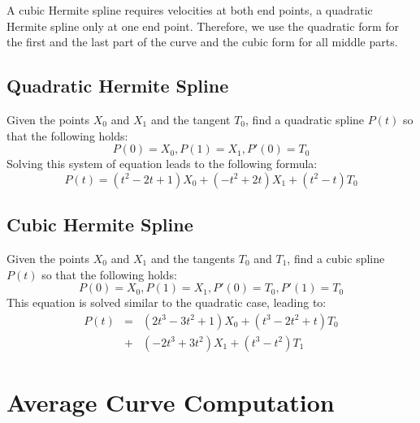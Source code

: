 \documentclass[journal, letterpaper]{IEEEtran}
\begin{document}
A cubic Hermite spline requires velocities at both end points, a quadratic Hermite spline only at one end point. Therefore, we use the quadratic form for the first and the last part of the curve and the cubic form for all middle parts.

\subsection{Quadratic Hermite Spline}
Given the points $X_0$ and $X_1$ and the tangent $T_0$, find a quadratic spline $P(t)$ so that the following holds:
\begin{equation}
 P(0)=X_0, P(1)=X_1, P'(0)=T_0
\end{equation}
Solving this system of equation leads to the following formula:
\begin{equation}
 P(t) = (t^2-2t+1)X_0 + (-t^2+2t)X_1 + (t^2-t)T_0
\label{eq:QuadraticHermite}
\end{equation}

\subsection{Cubic Hermite Spline}
Given the points $X_0$ and $X_1$ and the tangents $T_0$ and $T_1$, find a cubic spline $P(t)$ so that the following holds:
\begin{equation}
 P(0)=X_0, P(1)=X_1, P'(0)=T_0, P'(1)=T_0
\end{equation}
This equation is solved similar to the quadratic case, leading to:
\begin{equation}
\begin{array}{rcl}
	P(t) &=& (2t^3-3t^2+1)X_0 + (t^3-2t^2+t)T_0 \\
	     &+& (-2t^3+3t^2)X_1 + (t^3-t^2)T_1
\end{array}
\label{eq:CubicHermite}
\end{equation}

\section{Average Curve Computation}\label{chapter:Tracing}
\end{document}
